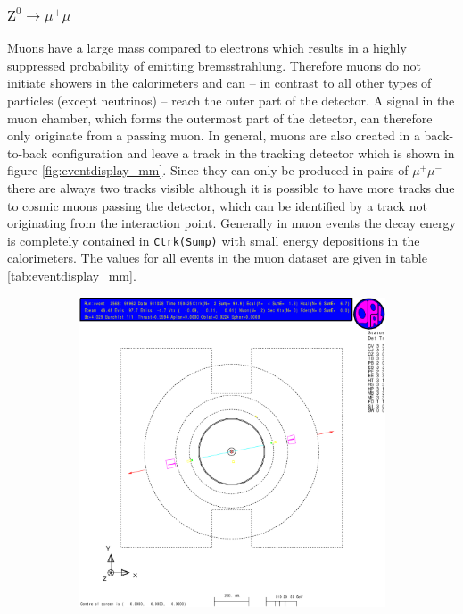 \documentclass[11pt, a4paper]{article}
\numberwithin{equation}{section}
\begin{document}
\subsubsection{$\mathrm{Z}^0\rightarrow \mu^+\mu^-$}
Muons have a large mass compared to electrons which results in a highly suppressed probability of emitting bremsstrahlung.
Therefore muons do not initiate showers in the calorimeters and can -- in contrast to all other types of particles (except neutrinos) -- reach the outer part of the detector.
A signal in the muon chamber, which forms the outermost part of the detector, can therefore only originate from a passing muon.
In general, muons are also created in a back-to-back configuration and leave a track in the tracking detector which is shown in figure \ref{fig:eventdisplay_mm}.
Since they can only be produced in pairs of $\mu^+\mu^-$ there are always two tracks visible although it is possible to have more tracks due to cosmic muons passing the detector, which can be identified by a track not originating from the interaction point.
Generally in muon events the decay energy is completely contained in \texttt{Ctrk(Sump)} with small energy depositions in the calorimeters.
The values for all events in the muon dataset are given in table \ref{tab:eventdisplay_mm}.
\begin{figure}[h]
	\centering
	\begin{subfigure}{\textwidth}
		\centering
		\includegraphics[width=.9\textwidth]{./data/tag1/mm_pics/cropped/mm_02}
	\end{subfigure}
\end{figure}
\end{document}
